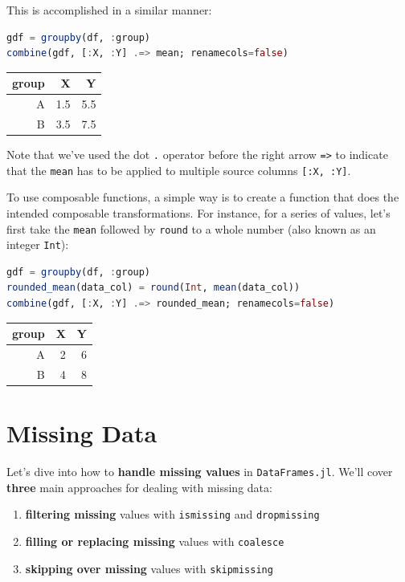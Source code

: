 \documentclass[
  notoc %
]{tufte-book}
\providecommand{\tightlist}{%
  \setlength{\itemsep}{0pt}\setlength{\parskip}{0pt}
}
\newcommand{\passthrough}[1]{#1}
\begin{document}
This is accomplished in a similar manner:

\begin{lstlisting}[language=Julia]
gdf = groupby(df, :group)
combine(gdf, [:X, :Y] .=> mean; renamecols=false)
\end{lstlisting}

\begin{longtable}[]{@{}rrr@{}}
\toprule()
group & X & Y \\
\midrule()
\endhead
A & 1.5 & 5.5 \\
B & 3.5 & 7.5 \\
\bottomrule()
\end{longtable}

Note that we've used the dot \passthrough{\lstinline!.!} operator before
the right arrow \passthrough{\lstinline!=>!} to indicate that the
\passthrough{\lstinline!mean!} has to be applied to multiple source
columns \passthrough{\lstinline![:X, :Y]!}.

To use composable functions, a simple way is to create a function that
does the intended composable transformations. For instance, for a series
of values, let's first take the \passthrough{\lstinline!mean!} followed
by \passthrough{\lstinline!round!} to a whole number (also known as an
integer \passthrough{\lstinline!Int!}):

\begin{lstlisting}[language=Julia]
gdf = groupby(df, :group)
rounded_mean(data_col) = round(Int, mean(data_col))
combine(gdf, [:X, :Y] .=> rounded_mean; renamecols=false)
\end{lstlisting}

\begin{longtable}[]{@{}rrr@{}}
\toprule()
group & X & Y \\
\midrule()
\endhead
A & 2 & 6 \\
B & 4 & 8 \\
\bottomrule()
\end{longtable}

\hypertarget{sec:missing}{%
\section{Missing Data}\label{sec:missing}}

Let's dive into how to \textbf{handle missing values} in
\passthrough{\lstinline!DataFrames.jl!}. We'll cover \textbf{three} main
approaches for dealing with missing data:

\begin{enumerate}
\def\labelenumi{\arabic{enumi}.}
\tightlist
\item
  \textbf{filtering missing} values with
  \passthrough{\lstinline!ismissing!} and
  \passthrough{\lstinline!dropmissing!}
\item
  \textbf{filling or replacing missing} values with
  \passthrough{\lstinline!coalesce!}
\item
  \textbf{skipping over missing} values with
  \passthrough{\lstinline!skipmissing!}
\end{enumerate}
\end{document}
